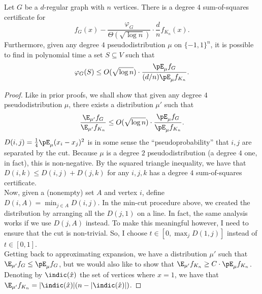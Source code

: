 	\begin{ftheo}
		Let $G$ be a $d$-regular graph with $n$ vertices. There is a degree $4$ sum-of-squares certificate for
		\[ f_G(x) - \frac{\varphi_G}{\Theta(\sqrt{\log n})} \cdot \frac{d}{n} f_{K_n}(x). \]
		Furthermore, given any degree $4$ pseudodistribution $\mu$ on $\{-1,1\}^n$, it is possible to find in polynomial time a set $S \subseteq V$ such that
		\[ \varphi_G(S) \le O(\sqrt{\log n}) \cdot \frac{\pE_\mu f_G}{(d/n) \pE_\mu f_{K_n}}. \]
	\end{ftheo}
	\begin{proof}
		Like in prior proofs, we shall show that given any degree $4$ pseudodistribution $\mu$, there exists a distribution $\mu'$ such that
		\[ \frac{\E_{\mu'} f_G}{\E_{\mu'} f_{K_n}} \le O(\sqrt{\log n}) \cdot \frac{\pE_\mu f_G}{\pE_\mu f_{K_n}}. \]
		$D(i,j) = \frac{1}{4} \pE_\mu (x_i - x_j)^2$ is in some sense the ``pseudoprobability'' that $i,j$ are separated by the cut. Because $\mu$ is a degree $2$ pseudodistribution (a degree $4$ one, in fact), this is non-negative. By the squared triangle inequality, we have that $D(i,k) \le D(i,j) + D(j,k)$ for any $i,j,k$ has a degree $4$ sum-of-squares certificate. \\
		Now, given a (nonempty) set $A$ and vertex $i$, define $D(i,A) = \min_{j \in A} D(i,j)$. In the min-cut procedure above, we created the distribution by arranging all the $D(j,1)$ on a line. In fact, the same analysis works if we use $D(j,A)$ instead. To make this meaningful however, I need to ensure that the cut is non-trivial. So, I choose $t \in [0,\max_j D(1,j)]$ instead of $t \in [0,1]$.\\
		Getting back to approximating expansion, we have a distribution $\mu'$ such that $\E_{\mu'} f_G \le \pE_{\mu} f_G$, but we would also like to show that $\E_{\mu'} f_{K_n} \ge C \cdot \pE_\mu f_{K_n}$. Denoting by $\indic(\hat{x})$ the set of vertices where $\hat{x} = 1$, we have that $\E_{\mu'} f_{K_n} = |\indic(\hat{x})|(n - |\indic(\hat{x})|)$.

	\end{proof}

